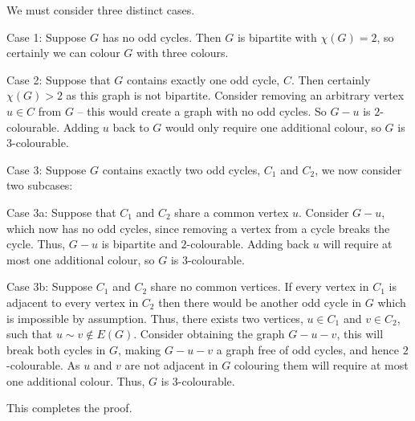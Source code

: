 \documentclass{article}
\begin{document}
We must consider three distinct cases.

Case 1: Suppose $G$ has no odd cycles. Then $G$ is bipartite with $\chi(G) = 2$, so certainly we can colour $G$ with three colours.

Case 2: Suppose that $G$ contains exactly one odd cycle, $C$. Then certainly $\chi(G) > 2$ as this graph is not bipartite. Consider removing an arbitrary vertex $u \in C$ from $G$ -- this would create a graph with no odd cycles. So $G - u$ is $2$-colourable. Adding $u$ back to $G$ would only require one additional colour, so $G$ is $3$-colourable.

Case 3: Suppose $G$ contains exactly two odd cycles, $C_1$ and $C_2$, we now consider two subcases:

Case 3a: Suppose that $C_1$ and $C_2$ share a common vertex $u$. Consider $G-u$, which now has no odd cycles, since removing a vertex from a cycle breaks the cycle. Thus, $G - u$ is bipartite and $2$-colourable. Adding back $u$ will require at most one additional colour, so $G$ is $3$-colourable.

Case 3b: Suppose $C_1$ and $C_2$ share no common vertices. If every vertex in $C_1$ is adjacent to every vertex in $C_2$ then there would be another odd cycle in $G$ which is impossible by assumption. Thus, there exists two vertices, $u \in C_1$ and $v \in C_2$, such that $u\sim v\notin E(G)$. Consider obtaining the graph $G - u - v$, this will break both cycles in $G$, making $G - u - v$ a graph free of odd cycles, and hence $2$-colourable. As $u$ and $v$ are not adjacent in $G$ colouring them will require at most one additional colour. Thus, $G$ is $3$-colourable.

This completes the proof.
\end{document}
